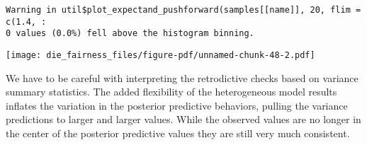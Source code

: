\documentclass[
  letterpaper,
  DIV=11,
  numbers=noendperiod]{scrartcl}
\newenvironment{Shaded}{\begin{snugshade}}{\end{snugshade}}
\newcommand{\AttributeTok}[1]{\textcolor[rgb]{0.40,0.45,0.13}{#1}}
\newcommand{\ControlFlowTok}[1]{\textcolor[rgb]{0.00,0.23,0.31}{#1}}
\newcommand{\DecValTok}[1]{\textcolor[rgb]{0.68,0.00,0.00}{#1}}
\newcommand{\FloatTok}[1]{\textcolor[rgb]{0.68,0.00,0.00}{#1}}
\newcommand{\FunctionTok}[1]{\textcolor[rgb]{0.28,0.35,0.67}{#1}}
\newcommand{\NormalTok}[1]{\textcolor[rgb]{0.00,0.23,0.31}{#1}}
\newcommand{\OtherTok}[1]{\textcolor[rgb]{0.00,0.23,0.31}{#1}}
\newcommand{\SpecialCharTok}[1]{\textcolor[rgb]{0.37,0.37,0.37}{#1}}
\newcommand{\StringTok}[1]{\textcolor[rgb]{0.13,0.47,0.30}{#1}}
\begin{document}
\begin{verbatim}
Warning in util$plot_expectand_pushforward(samples[[name]], 20, flim = c(1.4, :
0 values (0.0%) fell above the histogram binning.
\end{verbatim}

\texttt{[image: die\_fairness\_files/figure-pdf/unnamed-chunk-48-2.pdf]}

We have to be careful with interpreting the retrodictive checks based on
variance summary statistics. The added flexibility of the heterogeneous
model results inflates the variation in the posterior predictive
behaviors, pulling the variance predictions to larger and larger values.
While the observed values are no longer in the center of the posterior
predictive values they are still very much consistent.

\begin{Shaded}
\end{Shaded}
\end{document}
